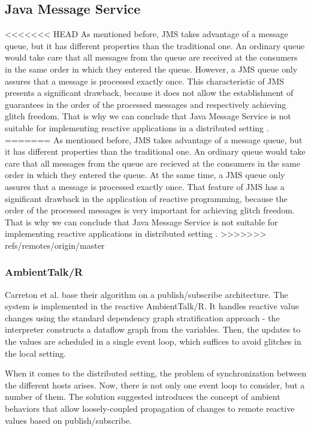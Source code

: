 \documentclass{sigplanconf}
\begin{document}
\subsection*{Java Message Service}

<<<<<<< HEAD
As mentioned before, JMS takes advantage of a message queue, but it has different properties than the traditional one. An ordinary queue would take care that all messages from the queue are received at the consumers in the same order in which they entered the queue. However, a JMS queue only assures that a message is processed exactly once. This characteristic of JMS presents a significant drawback, because it does not allow the establishment of guarantees in the order of the processed messages and respectively achieving glitch freedom. That is why we can conclude that Java Message Service is not suitable for implementing reactive applications in a distributed setting \cite{jms} \cite{jmsd}.
=======
As mentioned before, JMS takes advantage of a message queue, but it has different properties than the traditional one. An ordinary queue would take care that all messages from the queue are recieved at the consumers in the same order in which they entered the queue. At the same time, a JMS queue only assures that a message is processed exactly once. That feature of JMS has a significant drawback in the application of reactive programming, because the order of the processed messages  is very important for achieving glitch freedom. That is why we can conclude that Java Message Service is not suitable for implementing reactive applications in distributed setting \cite{jms} \cite{jmsd}.
>>>>>>> refs/remotes/origin/master

\subsubsection{AmbientTalk/R}
Carreton et al. \cite{loosely} base their algorithm on a publish/subscribe architecture. The system is implemented in the reactive AmbientTalk/R. It handles reactive value changes using the standard dependency graph stratification approach - the interpreter constructs a dataflow graph from the variables. Then, the updates to the values are scheduled in a single event loop, which suffices to avoid glitches in the local setting. 

When it comes to the distributed setting, the problem of synchronization between the different hosts arises. Now, there is not only one event loop to consider, but a number of them. The solution suggested introduces the concept of ambient behaviors that allow loosely-coupled propagation of changes to remote reactive values based on publish/subscribe. 
\end{document}
